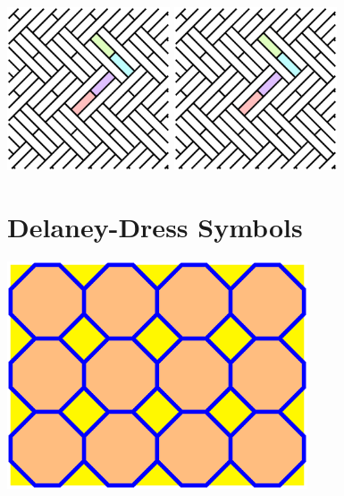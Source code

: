\documentclass{beamer}
\begin{document}
\begin{frame}
  \begin{center}
    \includegraphics[width=1.9in]{c12}
    \includegraphics[width=1.9in]{c12}
  \end{center}
\end{frame}


\section{Delaney-Dress Symbols}

\begin{frame}
  \begin{center}
    \includegraphics[width=3.5in]{dsymbol1}
  \end{center}
\end{frame}
\end{document}
